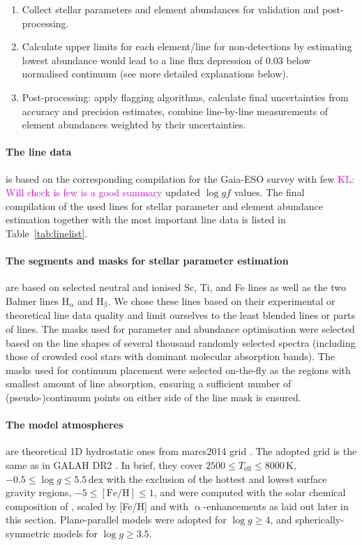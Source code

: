 \documentclass[fleqn,usenatbib,useAMS]{mnras}
\newcommand\KL[1]{\textcolor{magenta}{KL: #1}}
\begin{document}
\begin{enumerate}
\item Collect stellar parameters and element abundances for validation and post-processing.
\item Calculate upper limits for each element/line for non-detections by estimating lowest abundance would lead to a line flux depression of 0.03 below normalised continuum (see more detailed explanations below).
\item Post-processing: apply flagging algorithms, calculate final uncertainties from accuracy and precision estimates, combine line-by-line measurements of element abundances weighted by their uncertainties.
\end{enumerate}

\paragraph*{The line data} is based on the corresponding compilation for the Gaia-ESO survey \citet{Heiter2015b, Heiter2020} with few \KL{Will check is few is a good summary} updated $\log gf$ values. The final compilation of the used lines for stellar parameter and element abundance estimation together with the most important line data is listed in Table~\ref{tab:linelist}.

\paragraph*{The segments and masks for stellar parameter estimation} are based on selected neutral and ionised Sc, Ti, and Fe lines as well as the two Balmer lines $\mathrm{H_\alpha}$ and $\mathrm{H_\beta}$. We chose these lines based on their experimental or theoretical line data quality and limit ourselves to the least blended lines or parts of lines. The masks used for parameter and abundance optimisation were selected based on the line shapes of several thousand randomly selected spectra (including those of crowded cool stars with dominant molecular absorption bands). The masks used for continuum placement were selected on-the-fly as the regions with smallest amount of line absorption, ensuring a sufficient number of (pseudo-)continuum points on either side of the line mask is ensured.

\paragraph*{The model atmospheres} are theoretical 1D hydrostatic ones from {\sc marcs2014} grid \citep{Gustafsson2008}.  The adopted grid is the same as in GALAH DR2 \citep[][Sect. 3.2]{Buder2018}. In brief, they cover $2500 \leq T_\mathrm{eff} \leq 8000\,\mathrm{K}$, $-0.5 \leq \log g \leq 5.5\,\mathrm{dex}$ with the exclusion of the hottest and lowest surface gravity regions, $-5 \leq \mathrm{[Fe/H]} \leq 1$, and were computed with the solar chemical composition of \citet{Grevesse2007}, scaled by [Fe/H] and with $\upalpha$-enhancements as laid out later in this section. Plane-parallel models were adopted for $\log g \geq 4$, and spherically-symmetric models for $\log g \geq 3.5$.
\end{document}
